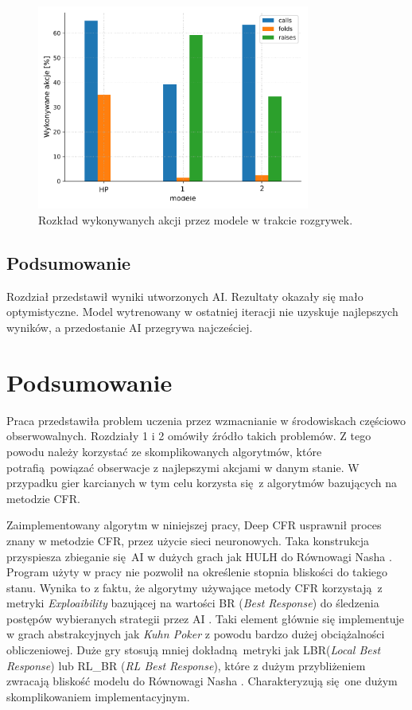 \documentclass[12pt,oneside,a4paper]{report}
\begin{document}
\begin{figure}[!ht]
  \centering
  \includegraphics[width=0.8\textwidth]{./img/honest4.pdf}
  \caption{Rozkład wykonywanych akcji przez modele w trakcie rozgrywek.}
\end{figure}

\section{Podsumowanie}


Rozdział przedstawił wyniki utworzonych AI. Rezultaty okazały się mało optymistyczne. Model
wytrenowany w ostatniej iteracji nie uzyskuje najlepszych wyników, a przedostanie AI przegrywa
najcześciej. 


\chapter{Podsumowanie}

Praca przedstawiła problem uczenia przez wzmacnianie w środowiskach częściowo obserwowalnych. 
Rozdziały 1 i 2 omówiły źródło takich problemów. Z tego powodu należy 
korzystać ze skomplikowanych algorytmów, które potrafią powiązać obserwacje z najlepszymi akcjami w
danym stanie. W przypadku gier karcianych w tym celu korzysta się z algorytmów bazujących na
metodzie CFR. 

Zaimplementowany algorytm w niniejszej pracy, Deep CFR usprawnił proces znany w metodzie CFR,
przez użycie sieci
neuronowych. Taka konstrukcja przyspiesza zbieganie się AI w dużych grach jak HULH
do Równowagi Nasha \cite{DCFR}.
Program użyty w pracy nie pozwolił na określenie stopnia bliskości
do takiego
stanu. Wynika to z faktu, że algorytmy używające metody CFR korzystają z metryki
\emph{Exploaibility} bazującej na wartości BR (\emph{Best Response})  do śledzenia postępów wybieranych
strategii przez AI \cite{lbr}.
Taki element głównie się implementuje w grach
abstrakcyjnych jak \emph{Kuhn Poker} z powodu bardzo dużej obciążalności obliczeniowej. 
Duże gry stosują mniej dokładną metryki jak LBR(\emph{Local Best Response}) lub
RL\_BR (\emph{RL Best Response}), które z dużym przybliżeniem zwracają bliskość
modelu do Równowagi Nasha \cite{lbr} \cite{RL}. Charakteryzują się one dużym skomplikowaniem 
implementacyjnym.
\end{document}
